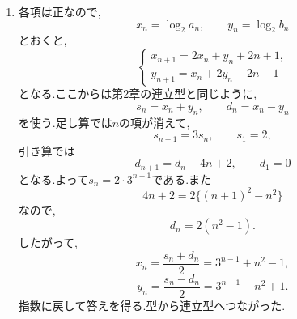 \begin{enumerate}[label=\textbf{問\arabic*.},leftmargin=3.8em,format=\bookitemlink{practice-advanced}{solution}{problem}]
    \noindent \textbf{【別解】}\\
    の式に両辺の係数を掛ける形のまま,
    \[
      (n+2)(n+4)d_{n+1}
      =(n+1)(n+3)d_n
    \]
    から$e_n=(n+1)(n+3)d_n$は一定で,$e_1=8$から$d_n=\frac{8}{(n+1)(n+3)}$を得る.
    積で残る因子をへ組み込んだ.
  \item 各項は正なので,
    \[
      x_n=\log_2a_n,\qquad y_n=\log_2b_n
    \]
    とおくと,
    \[
      \begin{cases}
        x_{n+1}=2x_n+y_n+2n+1,\\
        y_{n+1}=x_n+2y_n-2n-1
      \end{cases}
    \]
    となる.ここからは第2章の連立型と同じように,
    \[
      s_n=x_n+y_n,\qquad d_n=x_n-y_n
    \]
    を使う.足し算では$n$の項が消えて,
    \[
      s_{n+1}=3s_n,\qquad s_1=2,
    \]
    引き算では
    \[
      d_{n+1}=d_n+4n+2,\qquad d_1=0
    \]
    となる.よって$s_n=2\cdot3^{n-1}$である.また
    \[
      4n+2=2\{(n+1)^2-n^2\}
    \]
    なので,
    \[
      d_n=2(n^2-1).
    \]
    したがって,
    \[
      x_n=\frac{s_n+d_n}{2}=3^{n-1}+n^2-1,
    \]
    \[
      y_n=\frac{s_n-d_n}{2}=3^{n-1}-n^2+1.
    \]
    指数に戻して答えを得る.型から連立型へつながった.


\end{enumerate}
